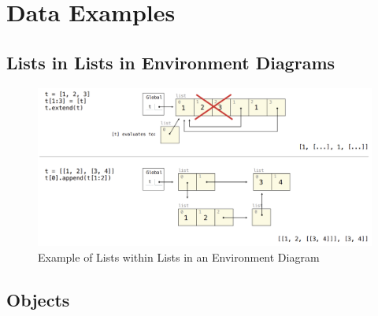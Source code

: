 \chapter{Data Examples}

\section{Lists in Lists in Environment Diagrams}
\medskip
\begin{figure}[H]
\includegraphics[width=1\linewidth]{figures/lists_in_lists_env_diagram.png}
\caption{Example of Lists within Lists in an Environment Diagram}
\end{figure}

\section{Objects}